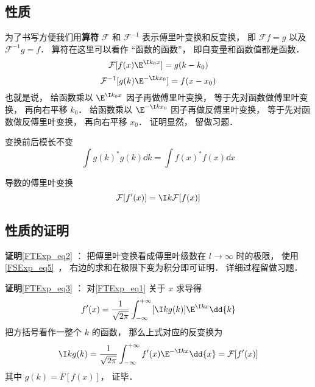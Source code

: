 
\subsection{性质}
为了书写方便我们用\textbf{算符} $\mathcal F$ 和 $\mathcal F^{-1}$ 表示傅里叶变换和反变换， 即 $\mathcal F f = g$ 以及 $\mathcal F^{-1} g = f$． 算符在这里可以看作 “函数的函数”， 即自变量和函数值都是函数．
\begin{equation}\label{FTExp_eq4}
\mathcal F [f(x) \E^{\I k_0 x}] = g(k - k_0)
\end{equation}
\begin{equation}
\mathcal F^{-1} [g(k) \E^{-\I k x_0}] = f(x - x_0)
\end{equation}
也就是说， 给函数乘以 $\E^{\I k_0 x}$ 因子再做傅里叶变换， 等于先对函数做傅里叶变换， 再向右平移 $k_0$． 给函数乘以 $\E^{-\I k x_0}$ 因子再做反傅里叶变换， 等于先对函数做反傅里叶变换， 再向右平移 $x_0$． 证明显然， 留做习题．

变换前后模长不变
\begin{equation}\label{FTExp_eq2}
\int g(k)^* g(k) \dd{k} = \int f(x)^* f(x) \dd{x}
\end{equation}

导数的傅里叶变换
\begin{equation}\label{FTExp_eq3}
\mathcal F [f'(x)] = \I k \mathcal F[f(x)]
\end{equation}

\subsection{性质的证明}

\textbf{证明}\autoref{FTExp_eq2} ： 把傅里叶变换看成傅里叶级数在 $l \to \infty$ 时的极限， 使用\autoref{FSExp_eq5}~， 右边的求和在极限下变为积分即可证明． 详细过程留做习题．

\textbf{证明}\autoref{FTExp_eq3} ： 对\autoref{FTExp_eq1} 关于 $x$ 求导得
\begin{equation}
f'(x) = \frac{1}{\sqrt{2\pi }} \int_{-\infty }^{+\infty } [\I kg(k)]\E^{\I kx} \dd{k}
\end{equation}
把方括号看作一整个 $k$ 的函数， 那么上式对应的反变换为
\begin{equation}
\I kg(k) = \frac{1}{\sqrt{2\pi }} \int_{-\infty }^{+\infty } f'(x) \E^{-\I kx} \dd{x} = \mathcal F [f'(x)]
\end{equation}
其中 $g(k) = F [f(x)]$， 证毕．
